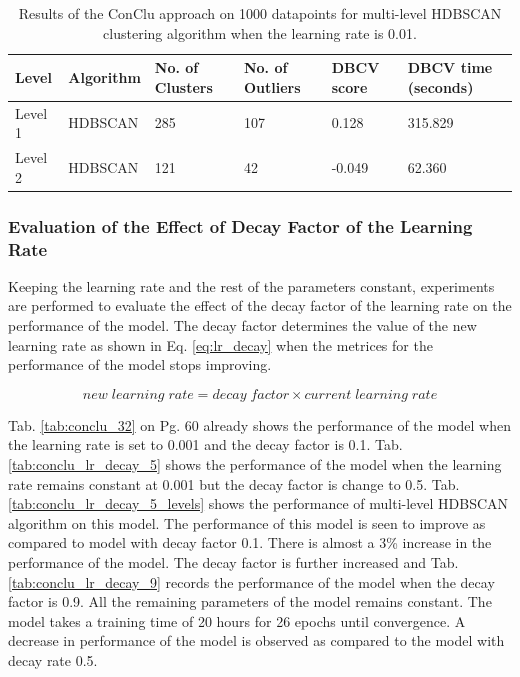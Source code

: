 \begin{table}[H]
  \setlength\extrarowheight{10pt}
  \caption{Results of the ConClu approach on 1000 datapoints for multi-level \ac{HDBSCAN} clustering algorithm when the learning rate is 0.01. }
  \centering
  \begin{tabular}{|l|l|l|l|l|l|}
    \toprule
    Level & Algorithm	& No. of Clusters	& No. of Outliers	& DBCV score	& \ac{DBCV} time (seconds)	\\  
    \midrule
    Level 1 & \ac{HDBSCAN} & 285	& 107	& 0.128	& 315.829 \\ \cline{1-6}
    Level 2 & \ac{HDBSCAN} & 121	& 42	& -0.049	& 62.360 \\ 
    \bottomrule
  \end{tabular}
  \label{tab:conclu_lr_01_levels}
\end{table}

\subsubsection{Evaluation of the Effect of Decay Factor of the Learning Rate}

Keeping the learning rate and the rest of the parameters constant, experiments are performed to evaluate the effect of the decay factor of the learning rate on the performance of the model. The decay factor determines the value of the new learning rate as shown in Eq. \ref{eq:lr_decay} when the metrices for the performance of the model stops improving.

\begin{equation}
  \label{eq:lr_decay}
  new \; learning \; rate = decay \; factor \times current \; learning \; rate
\end{equation}

Tab. \ref{tab:conclu_32} on Pg. 60 already shows the performance of the model when the learning rate is set to 0.001 and the decay factor is 0.1. Tab. \ref{tab:conclu_lr_decay_5} shows the performance of the model when the learning rate remains constant at 0.001 but the decay factor is change to 0.5. Tab. \ref{tab:conclu_lr_decay_5_levels} shows the performance of multi-level \Ac{HDBSCAN} algorithm on this model. The performance of this model is seen to improve as compared to model with decay factor 0.1. There is almost a 3\% increase in the performance of the model. The decay factor is further increased and Tab. \ref{tab:conclu_lr_decay_9} records the performance of the model when the decay factor is 0.9. All the remaining parameters of the model remains constant. The model takes a training time of 20 hours for 26 epochs until convergence. A decrease in performance of the model is observed as compared to the model with decay rate 0.5.

